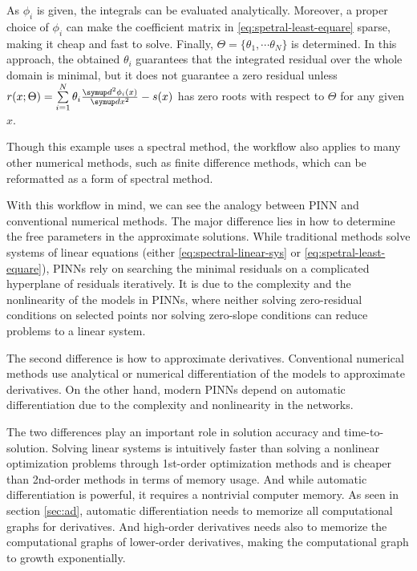 As $\phi_i$ is given, the integrals can be evaluated analytically.
Moreover, a proper choice of $\phi_i$ can make the coefficient matrix in \eqref{eq:spetral-least-equare} sparse, making it cheap and fast to solve.
Finally, $\Theta=\{\theta_1,\cdots\theta_N\}$ is determined.
In this approach, the obtained $\theta_i$ guarantees that the integrated residual over the whole domain is minimal, but it does not guarantee a zero residual unless $r(x; \Theta) = \sum\limits_{i=1}^{N}\theta_i \frac{\diff^2 \phi_i(x)}{\diff x^2} - s(x)$ has zero roots with respect to $\Theta$ for any given $x$.

Though this example uses a spectral method, the workflow also applies to many other numerical methods, such as finite difference methods, which can be reformatted as a form of spectral method.

With this workflow in mind, we can see the analogy between PINN and conventional numerical methods.
The major difference lies in how to determine the free parameters in the approximate solutions.
While traditional methods solve systems of linear equations (either \eqref{eq:spectral-linear-sys} or \eqref{eq:spetral-least-equare}), PINNs rely on searching the minimal residuals on a complicated hyperplane of residuals iteratively.
It is due to the complexity and the nonlinearity of the models in PINNs, where neither solving zero-residual conditions on selected points nor solving zero-slope conditions can reduce problems to a linear system. 

The second difference is how to approximate derivatives.
Conventional numerical methods use analytical or numerical differentiation of the models to approximate derivatives.
On the other hand, modern PINNs depend on automatic differentiation due to the complexity and nonlinearity in the networks.

The two differences play an important role in solution accuracy and time-to-solution.
Solving linear systems is intuitively faster than solving a nonlinear optimization problems through 1st-order optimization methods and is cheaper than 2nd-order methods in terms of memory usage.
And while automatic differentiation is powerful, it requires a nontrivial computer memory.
As seen in section \ref{sec:ad}, automatic differentiation needs to memorize all computational graphs for derivatives.
And high-order derivatives needs also to memorize the computational graphs of lower-order derivatives, making the computational graph to growth exponentially.


